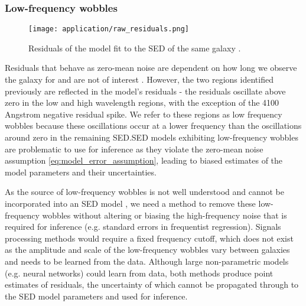 \subsubsection{Low-frequency wobbles}
\begin{figure}[H]
    \texttt{[image: application/raw\_residuals.png]}
    \caption{Residuals of the model fit to the SED of the same galaxy \cite{galaxy-gp-noise}.}
\end{figure}
Residuals that behave as zero-mean noise are dependent on how long we observe the galaxy for and are not of interest \cite{galaxy-spectra-101}. However, the two regions identified previously are reflected in the model's residuals - the residuals oscillate above zero in the low and high wavelength regions, with the exception of the 4100 Angstrom negative residual spike. We refer to these regions as low frequency wobbles because these oscillations occur at a lower frequency than the oscillations around zero in the remaining SED.SED models exhibiting low-frequency wobbles are problematic to use for inference as they violate the zero-mean noise assumption \ref{eq:model_error_assumption}, leading to biased estimates of the model parameters and their uncertainties.


As the source of low-frequency wobbles is not well understood and cannot be incorporated into an SED model \cite{galaxy-spectra-101}, we need a method to remove these low-frequency wobbles without altering or biasing the high-frequency noise that is required for inference (e.g. standard errors in frequentist regression). Signals processing methods would require a fixed frequency cutoff, which does not exist as the amplitude and scale of the low-frequency wobbles vary between galaxies and needs to be learned from the data. Although large non-parametric models (e.g. neural networks) could learn from data, both methods produce point estimates of residuals, the uncertainty of which cannot be propagated through to the SED model parameters and used for inference.

